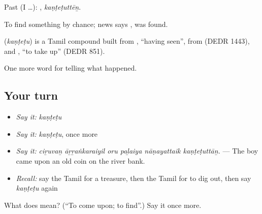 Past (I …): , \emph{kaṇṭeṭuttēṉ}.

To find something by chance; news says , was found.

\begin{cousinweb}
\textbf{} (\emph{kaṇṭeṭu}) is a Tamil compound built from , \textquotedblleft{}having seen\textquotedblright{}, from  (DEDR 1443), and , \textquotedblleft{}to take up\textquotedblright{} (DEDR 851).
\end{cousinweb}

\begin{grammarlens}[title={What you've built}]
One more word for telling what happened.
\end{grammarlens}

\subsection*{Your turn}
\begin{itemize}
\raggedright
  \item \emph{Say it:} \emph{kaṇṭeṭu}
  \item \emph{Say it:} \emph{kaṇṭeṭu}, once more
  \item \emph{Say it:} \emph{ciṟuvaṉ āṟṟaṅkaraiyil oru paḻaiya nāṇayattaik kaṇṭeṭuttāṉ.} — The boy came upon an old coin on the river bank.
  \item \emph{Recall:} say the Tamil for a treasure, then the Tamil for to dig out, then say \emph{kaṇṭeṭu} again
\end{itemize}

\begin{tcolorbox}[breakable,colback=teal!4,colframe=teal!35!black,title={Before you move on}]
What does  mean? (\textquotedblleft{}To come upon; to find\textquotedblright{}.) Say it once more.
\end{tcolorbox}
